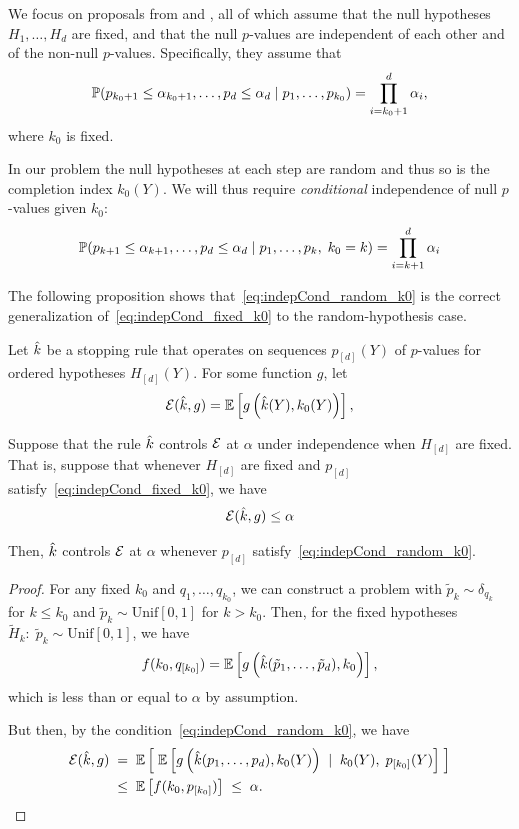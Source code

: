 \documentclass{article}
\begin{document}
We focus on proposals from \citet{gsell2013sequential} and \citet{li2015accumulation}, all of which assume that the null hypotheses $H_{1}, \ldots, H_{d}$ are fixed, and that the null $p$-values are independent of each other and of the non-null $p$-values. Specifically, they assume that
\begin{equation}\label{eq:indepCond_fixed_k0}
\P(p_{k_0+1} \leq \alpha_{k_0+1}, \ldots, p_d \leq \alpha_d
\mid p_1, \ldots, p_{k_0}) = \prod_{i=k_0+1}^d \alpha_i,
\end{equation}
where $k_0$ is fixed.

In our problem the null hypotheses at each step are random and thus so is the completion index $k_0(Y)$. We will thus require {\em conditional} independence of null $p$-values given $k_0$:
\begin{equation}\label{eq:indepCond_random_k0}
  \P(p_{k+1} \leq \alpha_{k+1}, \ldots, p_d \leq \alpha_d
  \mid p_1, \ldots, p_k, \; k_0 = k) = \prod_{i=k+1}^d \alpha_i
\end{equation}

The following proposition shows that~\eqref{eq:indepCond_random_k0} is the correct generalization of~\eqref{eq:indepCond_fixed_k0} to the random-hypothesis case.
\begin{proposition}
  Let $\hk$ be a stopping rule that operates on sequences
  $p_{[d]}(Y)$ of $p$-values for ordered hypotheses $H_{[d]}(Y)$. 
  For some function $g$, let 
  \[
  \Err(\hk,g) = \E\left[ g\left(\hk(Y), k_0(Y)\right)\right],
  \]
  
  Suppose that the rule $\hk$ controls $\Err$ at $\alpha$ under
  independence when $H_{[d]}$ are fixed. That is, suppose that
  whenever $H_{[d]}$ are fixed and $p_{[d]}$
  satisfy~\eqref{eq:indepCond_fixed_k0}, we have
  \[
  \Err(\hk, g) \leq \alpha
  \]

  Then, $\hk$ controls $\Err$ at $\alpha$
  whenever $p_{[d]}$ satisfy~\eqref{eq:indepCond_random_k0}.
\end{proposition}
\begin{proof}
  For any fixed $k_0$ and $q_1,\ldots, q_{k_0}$, we can construct a
  problem with $\tilde p_k \sim \delta_{q_k}$ for $k\leq k_0$ and 
  $\tilde p_k \sim \text{Unif}[0,1]$ for $k > k_0$. Then, for the
  fixed hypotheses 
  $\widetilde H_k:\; \tilde p_k \sim \text{Unif}[0,1]$, we have
  \[
  f(k_0, q_{[k_0]}) 
  = \E\left[ g\left(\hk(\tilde p_1, \ldots, \tilde p_d),
      k_0\right) \right],
  \]
  which is less than or equal to $\alpha$ by assumption.

  But then, by the condition~\eqref{eq:indepCond_random_k0}, we have
  \begin{align}
    \Err(\hk,g) &\;=\; \E\left[ \;\E\left[ g\left(\hk(p_1,\ldots, p_d), k_0(Y)\right) \; \mid \; k_0(Y), \; p_{[k_0]}(Y)\right] \; \right]\\
    &\;\leq\; \E\left[f(k_0, p_{[k_0]})\right] \;\leq\; \alpha.
  \end{align}
\end{proof}
\end{document}

